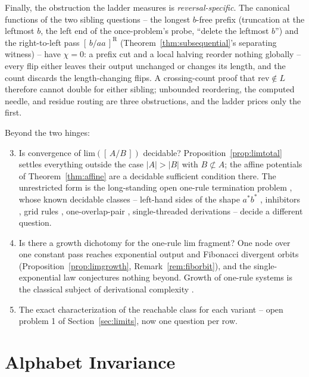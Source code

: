 \documentclass[runningheads,envcountsect]{llncs}
\renewenvironment{remark}
  {\rmfamily\trivlist\item[\hskip\labelsep{\itshape Remark.}]\ignorespaces}
  {\endtrivlist}
\begin{document}
\begin{remark}
    Finally, the obstruction the ladder measures is \emph{reversal-specific}. The canonical functions of the two sibling questions -- the longest $b$-free prefix (truncation at the leftmost $b$, the left end of the once-problem's probe, ``delete the leftmost $b$'') and the right-to-left pass $[\,b/aa\,]^{\mathrm{R}}$ (Theorem~\ref{thm:subsequential}'s separating witness) -- have $\chi = 0$: a prefix cut and a local halving reorder nothing globally -- every flip either leaves their output unchanged or changes its length, and the count discards the length-changing flips. A crossing-count proof that $\mathrm{rev} \notin L$ therefore cannot double for either sibling; unbounded reordering, the computed needle, and residue routing are three obstructions, and the ladder prices only the first.
\end{remark}

Beyond the two hinges:
\begin{enumerate} \setcounter{enumi}{2}
    \item Is convergence of $\mathrm{lim}([\,A/B\,])$ decidable? Proposition~\ref{prop:limtotal} settles everything outside the case $|A| > |B|$ with $B \not\subset A$; the affine potentials of Theorem~\ref{thm:affine} are a decidable sufficient condition there. The unrestricted form is the long-standing open one-rule termination problem \cite{geser01}, whose known decidable classes -- left-hand sides of the shape $a^*b^*$ \cite{senizergues96}, inhibitors \cite{mcnaughton01}, grid rules \cite{geser02}, one-overlap-pair \cite{geser03}, single-threaded derivations \cite{moczydlowski05} -- decide a different question.
    \item Is there a growth dichotomy for the one-rule $\mathrm{lim}$ fragment? One node over one constant pass reaches exponential output and Fibonacci divergent orbits (Proposition~\ref{prop:limgrowth}, Remark~\ref{rem:fiborbit}), and the single-exponential law conjectures nothing beyond. Growth of one-rule systems is the classical subject of derivational complexity \cite{kobayashi01}.
    \item The exact characterization of the reachable class for each variant -- open problem 1 of Section~\ref{sec:limits}, now one question per row.
\end{enumerate}

\section{Alphabet Invariance}
\label{sec:alphabet}
\end{document}
